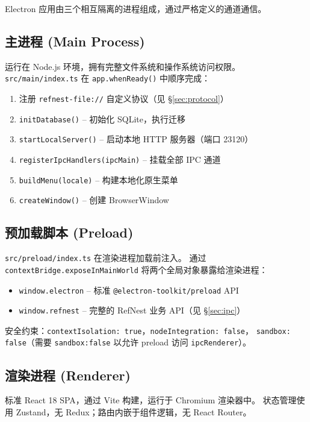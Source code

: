 \documentclass[12pt, a4paper]{article}
\begin{document}
Electron 应用由三个相互隔离的进程组成，通过严格定义的通道通信。

\subsection{主进程 (Main Process)}

运行在 Node.js 环境，拥有完整文件系统和操作系统访问权限。
\texttt{src/main/index.ts} 在 \texttt{app.whenReady()} 中顺序完成：

\begin{enumerate}[leftmargin=2em, itemsep=2pt]
  \item 注册 \texttt{refnest-file://} 自定义协议（见 \S\ref{sec:protocol}）
  \item \texttt{initDatabase()} -- 初始化 SQLite，执行迁移
  \item \texttt{startLocalServer()} -- 启动本地 HTTP 服务器（端口 23120）
  \item \texttt{registerIpcHandlers(ipcMain)} -- 挂载全部 IPC 通道
  \item \texttt{buildMenu(locale)} -- 构建本地化原生菜单
  \item \texttt{createWindow()} -- 创建 BrowserWindow
\end{enumerate}

\subsection{预加载脚本 (Preload)}

\texttt{src/preload/index.ts} 在渲染进程加载前注入。
通过 \texttt{contextBridge.exposeInMainWorld} 将两个全局对象暴露给渲染进程：

\begin{itemize}[leftmargin=2em, itemsep=2pt]
  \item \texttt{window.electron} -- 标准 \texttt{@electron-toolkit/preload} API
  \item \texttt{window.refnest} -- 完整的 RefNest 业务 API（见 \S\ref{sec:ipc}）
\end{itemize}

安全约束：\texttt{contextIsolation: true}，\texttt{nodeIntegration: false}，
\texttt{sandbox: false}（需要 \texttt{sandbox:false} 以允许 preload 访问 \texttt{ipcRenderer}）。

\subsection{渲染进程 (Renderer)}

标准 React 18 SPA，通过 Vite 构建，运行于 Chromium 渲染器中。
状态管理使用 Zustand，无 Redux；路由内嵌于组件逻辑，无 React Router。
\end{document}
